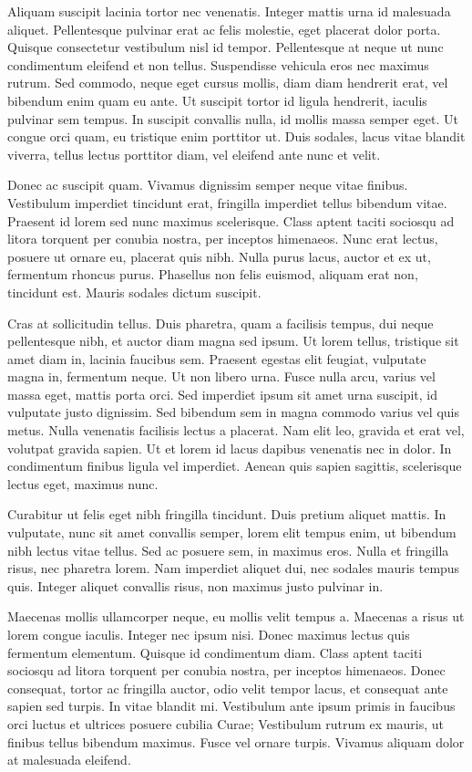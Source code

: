 Aliquam suscipit lacinia tortor nec venenatis. Integer mattis urna id malesuada aliquet. Pellentesque pulvinar erat ac felis molestie, eget placerat dolor porta. Quisque consectetur vestibulum nisl id tempor. Pellentesque at neque ut nunc condimentum eleifend et non tellus. Suspendisse vehicula eros nec maximus rutrum. Sed commodo, neque eget cursus mollis, diam diam hendrerit erat, vel bibendum enim quam eu ante. Ut suscipit tortor id ligula hendrerit, iaculis pulvinar sem tempus. In suscipit convallis nulla, id mollis massa semper eget. Ut congue orci quam, eu tristique enim porttitor ut. Duis sodales, lacus vitae blandit viverra, tellus lectus porttitor diam, vel eleifend ante nunc et velit.

Donec ac suscipit quam. Vivamus dignissim semper neque vitae finibus. Vestibulum imperdiet tincidunt erat, fringilla imperdiet tellus bibendum vitae. Praesent id lorem sed nunc maximus scelerisque. Class aptent taciti sociosqu ad litora torquent per conubia nostra, per inceptos himenaeos. Nunc erat lectus, posuere ut ornare eu, placerat quis nibh. Nulla purus lacus, auctor et ex ut, fermentum rhoncus purus. Phasellus non felis euismod, aliquam erat non, tincidunt est. Mauris sodales dictum suscipit.

Cras at sollicitudin tellus. Duis pharetra, quam a facilisis tempus, dui neque pellentesque nibh, et auctor diam magna sed ipsum. Ut lorem tellus, tristique sit amet diam in, lacinia faucibus sem. Praesent egestas elit feugiat, vulputate magna in, fermentum neque. Ut non libero urna. Fusce nulla arcu, varius vel massa eget, mattis porta orci. Sed imperdiet ipsum sit amet urna suscipit, id vulputate justo dignissim. Sed bibendum sem in magna commodo varius vel quis metus. Nulla venenatis facilisis lectus a placerat. Nam elit leo, gravida et erat vel, volutpat gravida sapien. Ut et lorem id lacus dapibus venenatis nec in dolor. In condimentum finibus ligula vel imperdiet. Aenean quis sapien sagittis, scelerisque lectus eget, maximus nunc.

Curabitur ut felis eget nibh fringilla tincidunt. Duis pretium aliquet mattis. In vulputate, nunc sit amet convallis semper, lorem elit tempus enim, ut bibendum nibh lectus vitae tellus. Sed ac posuere sem, in maximus eros. Nulla et fringilla risus, nec pharetra lorem. Nam imperdiet aliquet dui, nec sodales mauris tempus quis. Integer aliquet convallis risus, non maximus justo pulvinar in.

Maecenas mollis ullamcorper neque, eu mollis velit tempus a. Maecenas a risus ut lorem congue iaculis. Integer nec ipsum nisi. Donec maximus lectus quis fermentum elementum. Quisque id condimentum diam. Class aptent taciti sociosqu ad litora torquent per conubia nostra, per inceptos himenaeos. Donec consequat, tortor ac fringilla auctor, odio velit tempor lacus, et consequat ante sapien sed turpis. In vitae blandit mi. Vestibulum ante ipsum primis in faucibus orci luctus et ultrices posuere cubilia Curae; Vestibulum rutrum ex mauris, ut finibus tellus bibendum maximus. Fusce vel ornare turpis. Vivamus aliquam dolor at malesuada eleifend.

